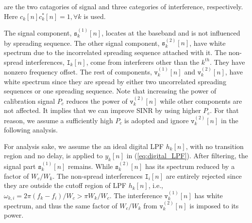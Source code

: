 \documentclass{IEEEtran}
\begin{document}
are the two catagories of signal and three categories of interference, respectively. Here $c_k[n]c^*_k[n] = 1, \forall k$ is used.

The signal component, $\mathtt{s}_k^{(1)}[n]$, locates at the baseband and is not influenced by spreading sequence. The other signal component, $\mathtt{s}_k^{(2)}[n]$, have white spectrum due to the incorrelated spreading sequence attached with it. The non-spread interferences, $\mathtt{I}_k[n]$, come from interferers other than the $k^{th}$. They have nonzero frequency offset. The rest of components, $\mathtt{v}_k^{(1)}[n]$ and $\mathtt{v}_k^{(2)}[n]$, have white spectrum since they are spread by either two uncorrelated spreading sequences or one spreading sequence. Note that increasing the power of calibration signal $P_c$ reduces the power of $\mathtt{v}_k^{(2)}[n]$ while other components are not affected. It implies that we can improve SINR by using higher $P_c$. For that reason, we assume a sufficiently high $P_c$ is adopted and ignore $\mathtt{v}_k^{(2)}[n]$ in the following analysis.

For analysis sake, we assume the an ideal digital LPF $h_k[n]$, with no transition region and no delay, is applied to $y_k[n]$ in (\ref{eq:digital_LPF}). After filtering, the signal part $\mathtt{s}_k^{(1)}[n]$ remains. While $\mathtt{s}_k^{(2)}[n]$ has its spectrum reduced by a factor of $W_c/W_k$. The non-spread interferences $\mathtt{I}_i[n]$ are entirely rejected since they are outside the cutoff region of LPF $h_k[n]$, i.e., $\omega_{k,i} = 2\pi (f_k-f_i)/W_c>\pi W_k/W_c$. The interference $\mathtt{v}_k^{(1)}[n]$ has white spectrum, and thus the same factor of $W_c/W_k$ from $\mathtt{v}_k^{(2)}[n]$ is imposed to its power. 
\end{document}
